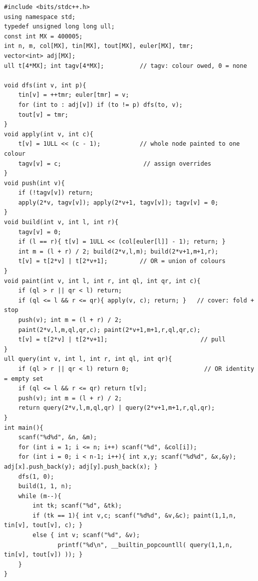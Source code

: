 \begin{lstlisting}[caption={CF 620E full solution: Euler-flatten + 60-bit colour mask, OR merge, assign tag}, label={lst:c15-620-soln}]
#include <bits/stdc++.h>
using namespace std;
typedef unsigned long long ull;
const int MX = 400005;
int n, m, col[MX], tin[MX], tout[MX], euler[MX], tmr;
vector<int> adj[MX];
ull t[4*MX]; int tagv[4*MX];          // tagv: colour owed, 0 = none

void dfs(int v, int p){
    tin[v] = ++tmr; euler[tmr] = v;
    for (int to : adj[v]) if (to != p) dfs(to, v);
    tout[v] = tmr;
}
void apply(int v, int c){
    t[v] = 1ULL << (c - 1);           // whole node painted to one colour
    tagv[v] = c;                       // assign overrides
}
void push(int v){
    if (!tagv[v]) return;
    apply(2*v, tagv[v]); apply(2*v+1, tagv[v]); tagv[v] = 0;
}
void build(int v, int l, int r){
    tagv[v] = 0;
    if (l == r){ t[v] = 1ULL << (col[euler[l]] - 1); return; }
    int m = (l + r) / 2; build(2*v,l,m); build(2*v+1,m+1,r);
    t[v] = t[2*v] | t[2*v+1];         // OR = union of colours
}
void paint(int v, int l, int r, int ql, int qr, int c){
    if (ql > r || qr < l) return;
    if (ql <= l && r <= qr){ apply(v, c); return; }   // cover: fold + stop
    push(v); int m = (l + r) / 2;
    paint(2*v,l,m,ql,qr,c); paint(2*v+1,m+1,r,ql,qr,c);
    t[v] = t[2*v] | t[2*v+1];                          // pull
}
ull query(int v, int l, int r, int ql, int qr){
    if (ql > r || qr < l) return 0;                     // OR identity = empty set
    if (ql <= l && r <= qr) return t[v];
    push(v); int m = (l + r) / 2;
    return query(2*v,l,m,ql,qr) | query(2*v+1,m+1,r,ql,qr);
}
int main(){
    scanf("%d%d", &n, &m);
    for (int i = 1; i <= n; i++) scanf("%d", &col[i]);
    for (int i = 0; i < n-1; i++){ int x,y; scanf("%d%d", &x,&y); adj[x].push_back(y); adj[y].push_back(x); }
    dfs(1, 0);
    build(1, 1, n);
    while (m--){
        int tk; scanf("%d", &tk);
        if (tk == 1){ int v,c; scanf("%d%d", &v,&c); paint(1,1,n, tin[v], tout[v], c); }
        else { int v; scanf("%d", &v);
               printf("%d\n", __builtin_popcountll( query(1,1,n, tin[v], tout[v]) )); }
    }
}
\end{lstlisting}

